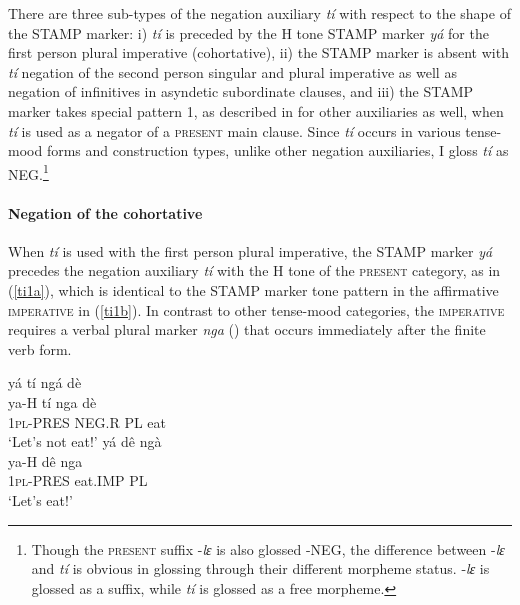 

There are three sub-types of the negation auxiliary {\itshape tí} with respect to the shape of the STAMP marker:
i) {\itshape tí} is preceded by the H tone STAMP marker {\itshape yá} for the first person plural imperative (cohortative), ii) the STAMP marker is absent with {\itshape tí} negation of the second person singular and plural imperative as well as negation of infinitives in asyndetic subordinate clauses, and iii) the STAMP marker takes special pattern 1, as described in  for other auxiliaries as well, when {\itshape tí} is used as a negator of a \textsc{present} main clause. Since {\itshape tí} occurs in various tense-mood forms and construction types, unlike other negation auxiliaries, I gloss {\itshape tí} as NEG.\footnote{Though the \textsc{present} suffix -{\itshape lɛ} is also glossed -NEG, the difference between -{\itshape lɛ} and {\itshape tí} is obvious in glossing through their different morpheme status. -{\itshape lɛ} is glossed as a suffix, while {\itshape tí} is glossed as a free morpheme.}



\paragraph{Negation of the cohortative}
When {\itshape tí} is used with the first person plural imperative, the STAMP marker {\itshape yá} precedes the negation auxiliary {\itshape tí} with the H tone of the \textsc{present} category, as in (\ref{ti1a}), which is identical to the STAMP marker tone pattern in the affirmative \textsc{imperative} in (\ref{ti1b}). In contrast to other tense-mood categories, the \textsc{imperative} requires a verbal plural marker {\itshape nga} () that occurs immediately after the finite verb form.
 
\begin{exe} 
\ex\label{ti1}
\begin{xlist}
\ex\label{ti1a}
  \glll  yá tí ngá dè \\
        ya-H tí nga dè \\
           1\textsc{pl}-PRES NEG.R PL  eat \\
    \trans `Let's not eat!'
\ex\label{ti1b}
  \glll  yá dê ngà \\
        ya-H dê nga \\
        1\textsc{pl}-PRES eat.IMP PL     \\
    \trans `Let's eat!'
\end{xlist}
\end{exe}

